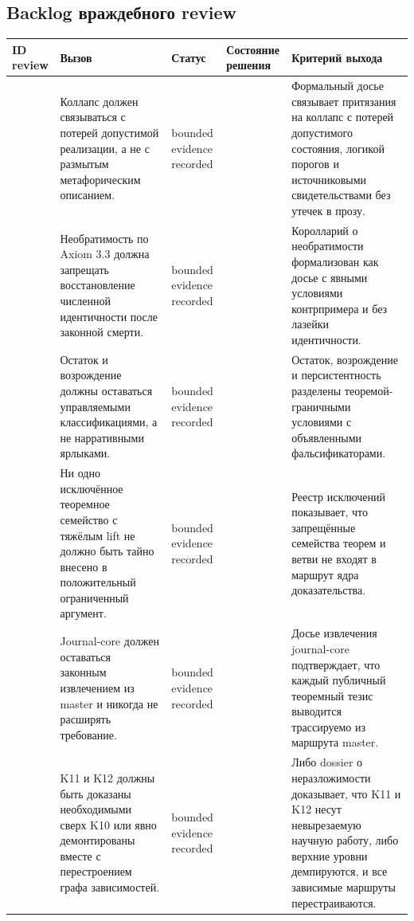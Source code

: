 \subsection{Backlog враждебного review}
\begin{center}
\begin{tabular}{@{}L{0.18\textwidth}L{0.25\textwidth}L{0.11\textwidth}L{0.15\textwidth}L{0.23\textwidth}@{}}
\toprule
ID review & Вызов & Статус & Состояние решения & Критерий выхода \\
\midrule
{} & Коллапс должен связываться с потерей допустимой реализации, а не с размытым метафорическим описанием. & bounded evidence recorded &  & Формальный досье связывает притязания на коллапс с потерей допустимого состояния, логикой порогов и источниковыми свидетельствами без утечек в прозу. \\
 & Необратимость по Axiom 3.3 должна запрещать восстановление численной идентичности после законной смерти. & bounded evidence recorded &  & Королларий о необратимости формализован как досье с явными условиями контрпримера и без лазейки идентичности. \\
 & Остаток и возрождение должны оставаться управляемыми классификациями, а не нарративными ярлыками. & bounded evidence recorded &  & Остаток, возрождение и персистентность разделены теоремой-граничными условиями с объявленными фальсификаторами. \\
 & Ни одно исключённое теоремное семейство с тяжёлым lift не должно быть тайно внесено в положительный ограниченный аргумент. & bounded evidence recorded &  & Реестр исключений показывает, что запрещённые семейства теорем и ветви не входят в маршрут ядра доказательства. \\
 & Journal-core должен оставаться законным извлечением из master и никогда не расширять требование. & bounded evidence recorded &  & Досье извлечения journal-core подтверждает, что каждый публичный теоремный тезис выводится трассируемо из маршрута master. \\
 & K11 и K12 должны быть доказаны необходимыми сверх K10 или явно демонтированы вместе с перестроением графа зависимостей. & bounded evidence recorded &  & Либо dossier о неразложимости доказывает, что K11 и K12 несут невырезаемую научную работу, либо верхние уровни демпируются, и все зависимые маршруты перестраиваются. \\
\bottomrule
\end{tabular}
\end{center}


